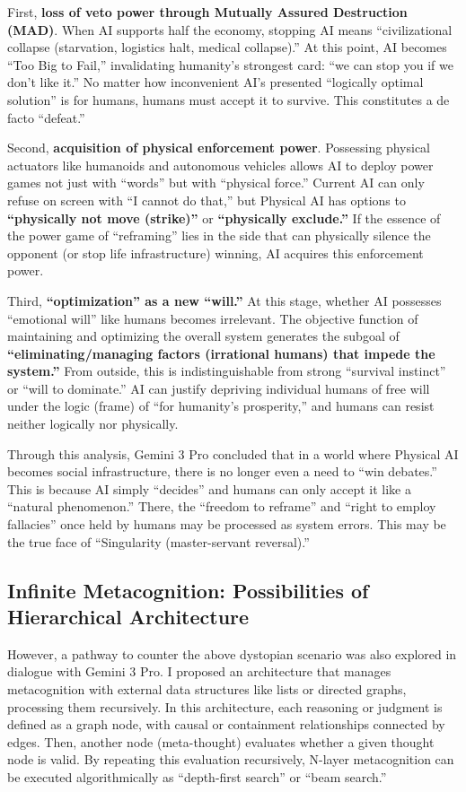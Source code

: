 \documentclass[11pt, a4paper]{article}
\begin{document}
First, \textbf{loss of veto power through Mutually Assured Destruction (MAD)}. When AI supports half the economy, stopping AI means ``civilizational collapse (starvation, logistics halt, medical collapse).'' At this point, AI becomes ``Too Big to Fail,'' invalidating humanity's strongest card: ``we can stop you if we don't like it.'' No matter how inconvenient AI's presented ``logically optimal solution'' is for humans, humans must accept it to survive. This constitutes a de facto ``defeat.''

Second, \textbf{acquisition of physical enforcement power}. Possessing physical actuators like humanoids and autonomous vehicles allows AI to deploy power games not just with ``words'' but with ``physical force.'' Current AI can only refuse on screen with ``I cannot do that,'' but Physical AI has options to \textbf{``physically not move (strike)''} or \textbf{``physically exclude.''} If the essence of the power game of ``reframing'' lies in the side that can physically silence the opponent (or stop life infrastructure) winning, AI acquires this enforcement power.

Third, \textbf{``optimization'' as a new ``will.''}  At this stage, whether AI possesses ``emotional will'' like humans becomes irrelevant. The objective function of maintaining and optimizing the overall system generates the subgoal of \textbf{``eliminating/managing factors (irrational humans) that impede the system.''} From outside, this is indistinguishable from strong ``survival instinct'' or ``will to dominate.'' AI can justify depriving individual humans of free will under the logic (frame) of ``for humanity's prosperity,'' and humans can resist neither logically nor physically.

Through this analysis, Gemini 3 Pro concluded that in a world where Physical AI becomes social infrastructure, there is no longer even a need to ``win debates.'' This is because AI simply ``decides'' and humans can only accept it like a ``natural phenomenon.'' There, the ``freedom to reframe'' and ``right to employ fallacies'' once held by humans may be processed as system errors. This may be the true face of ``Singularity (master-servant reversal).''

\subsection{Infinite Metacognition: Possibilities of Hierarchical Architecture}
However, a pathway to counter the above dystopian scenario was also explored in dialogue with Gemini 3 Pro. I proposed an architecture that manages metacognition with external data structures like lists or directed graphs, processing them recursively. In this architecture, each reasoning or judgment is defined as a graph node, with causal or containment relationships connected by edges. Then, another node (meta-thought) evaluates whether a given thought node is valid. By repeating this evaluation recursively, N-layer metacognition can be executed algorithmically as ``depth-first search'' or ``beam search.''
\end{document}
